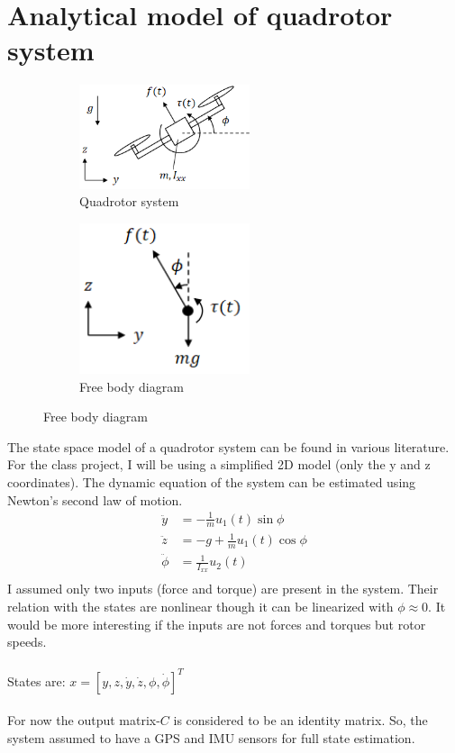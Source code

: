 \documentclass[12pt]{article}
\begin{document}
\section*{Analytical model of quadrotor system}
\begin{figure}[h!]
    \begin{subfigure}[t]{0.5\textwidth}
        \centering
        \includegraphics[width=5cm]{figures/model_diagram.png}
        \caption{Quadrotor system \cite{model_diagram}}
        \label{fig:01}
    \end{subfigure}
    \hfill
    \begin{subfigure}[t]{0.5\textwidth}
        \centering
        \includegraphics[width=5cm]{figures/free_body_diagram.png}
        \caption{Free body diagram \cite{model_diagram}}
        \label{fig:02}
    \end{subfigure}
\end{figure}

The state space model of a quadrotor system can be found in various literature\cite{K2019}\cite{Schreier2012}. For the class project, I will be using a simplified 2D model (only the y and z coordinates). The dynamic equation of the system can be estimated using Newton's second law of motion.
\begin{align*}
    \ddot{y} &= -\frac{1}{m}u_1(t) \sin{\phi} \\
    \ddot{z} &= -g + \frac{1}{m}u_1(t) \cos{\phi} \\ 
    \ddot{\phi} &= \frac{1}{I_{xx}}u_2(t) \\
\end{align*}
I assumed only two inputs (force and torque) are present in the system. Their relation with the states are nonlinear though it can be linearized with $\phi \approx 0$. It would be more interesting if the inputs are not forces and torques but rotor speeds. \\\\
States are: $x = [y, z, \dot{y}, \dot{z}, \phi, \dot{\phi}]^T$ \\\\
For now the output matrix-$C$ is considered to be an identity matrix. So, the system assumed to have a GPS and IMU sensors for full state estimation.
\end{document}
